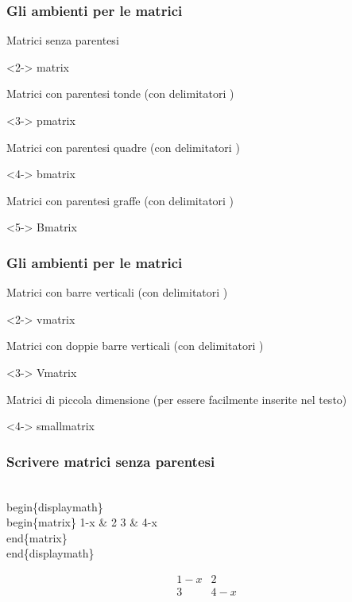 \documentclass[svgnames,%
	ucs,%
	pdftex]{guitbeamer}
\begin{document}
\begin{frame}
  \frametitle{Gli ambienti per le matrici}
	Matrici	senza parentesi
	\begin{LaTeXcode}<2->
		matrix
	\end{LaTeXcode}
	Matrici con parentesi tonde (con delimitatori \LCmd[]{(}\;\LCmd[]{)})
	\begin{LaTeXcode}<3->
		pmatrix
	\end{LaTeXcode}
	Matrici con parentesi quadre (con delimitatori \LCmd[]{\ls\;\rs})
	\begin{LaTeXcode}<4->
		bmatrix
	\end{LaTeXcode}
	Matrici con parentesi graffe (con delimitatori \LCmd[]{\tlb}\;\LCmd[]{\trb})
	\begin{LaTeXcode}<5->
		Bmatrix
	\end{LaTeXcode}
\end{frame}
\begin{frame}
  \frametitle{Gli ambienti per le matrici}
	Matrici con barre verticali (con delimitatori \LCmd[]{|}\;\LCmd[]{|})
	\begin{LaTeXcode}<2->
		vmatrix
	\end{LaTeXcode}
	Matrici con doppie barre verticali (con delimitatori \LCmd[]{||}\;\LCmd[]{||})
	\begin{LaTeXcode}<3->
		Vmatrix
	\end{LaTeXcode}
	Matrici di piccola dimensione (per essere facilmente inserite nel testo)
	\begin{LaTeXcode}<4->
		smallmatrix
	\end{LaTeXcode}
\end{frame}
\begin{frame}
  \frametitle{Scrivere matrici senza parentesi}
	\begin{LaTeXcode}
		\\begin\{displaymath\}\n
		\alert{\\begin\{matrix\}}\n
		\hspace*{5ex} 1-x \& 2 \bs\bs\n
		\hspace*{5ex} 3   \& 4-x \n
		\alert{\\end\{matrix\}}\n
		\\end\{displaymath\}
	\end{LaTeXcode}
	\begin{LaTeXoutput}
		\begin{displaymath}
		\begin{matrix} 
		1-x & 2 \\
		3 & 4-x 
		\end{matrix}
		\end{displaymath}
	\end{LaTeXoutput}
\end{frame}
\end{document}

